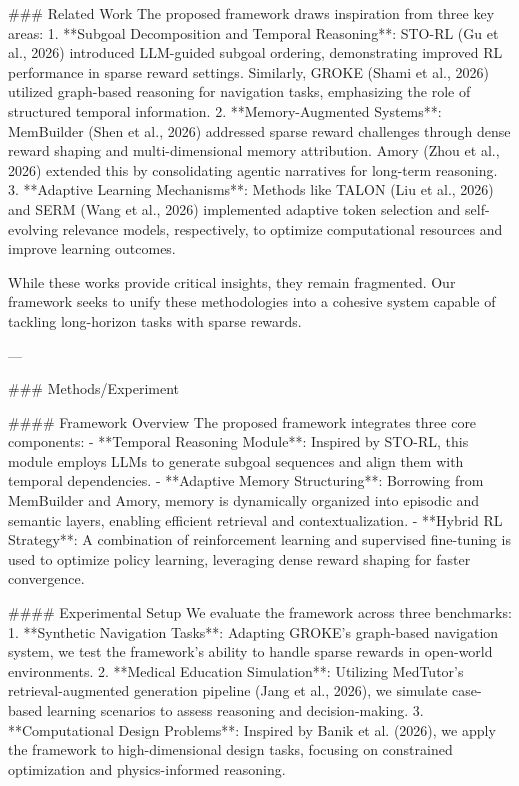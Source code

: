### Related Work  
The proposed framework draws inspiration from three key areas:  
1. **Subgoal Decomposition and Temporal Reasoning**: STO-RL (Gu et al., 2026) introduced LLM-guided subgoal ordering, demonstrating improved RL performance in sparse reward settings. Similarly, GROKE (Shami et al., 2026) utilized graph-based reasoning for navigation tasks, emphasizing the role of structured temporal information.  
2. **Memory-Augmented Systems**: MemBuilder (Shen et al., 2026) addressed sparse reward challenges through dense reward shaping and multi-dimensional memory attribution. Amory (Zhou et al., 2026) extended this by consolidating agentic narratives for long-term reasoning.  
3. **Adaptive Learning Mechanisms**: Methods like TALON (Liu et al., 2026) and SERM (Wang et al., 2026) implemented adaptive token selection and self-evolving relevance models, respectively, to optimize computational resources and improve learning outcomes.  

While these works provide critical insights, they remain fragmented. Our framework seeks to unify these methodologies into a cohesive system capable of tackling long-horizon tasks with sparse rewards.

---

### Methods/Experiment  

#### Framework Overview  
The proposed framework integrates three core components:  
- **Temporal Reasoning Module**: Inspired by STO-RL, this module employs LLMs to generate subgoal sequences and align them with temporal dependencies.  
- **Adaptive Memory Structuring**: Borrowing from MemBuilder and Amory, memory is dynamically organized into episodic and semantic layers, enabling efficient retrieval and contextualization.  
- **Hybrid RL Strategy**: A combination of reinforcement learning and supervised fine-tuning is used to optimize policy learning, leveraging dense reward shaping for faster convergence.

#### Experimental Setup  
We evaluate the framework across three benchmarks:  
1. **Synthetic Navigation Tasks**: Adapting GROKE's graph-based navigation system, we test the framework's ability to handle sparse rewards in open-world environments.  
2. **Medical Education Simulation**: Utilizing MedTutor's retrieval-augmented generation pipeline (Jang et al., 2026), we simulate case-based learning scenarios to assess reasoning and decision-making.  
3. **Computational Design Problems**: Inspired by Banik et al. (2026), we apply the framework to high-dimensional design tasks, focusing on constrained optimization and physics-informed reasoning.  

